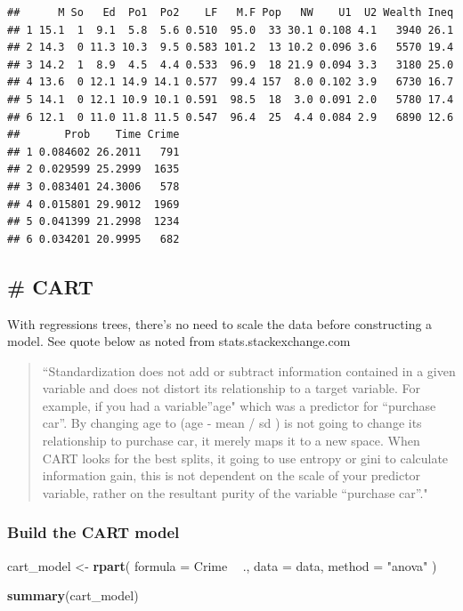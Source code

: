 \documentclass[]{article}
\newenvironment{Shaded}{\begin{snugshade}}{\end{snugshade}}
\newcommand{\KeywordTok}[1]{\textcolor[rgb]{0.13,0.29,0.53}{\textbf{#1}}}
\newcommand{\DataTypeTok}[1]{\textcolor[rgb]{0.13,0.29,0.53}{#1}}
\newcommand{\StringTok}[1]{\textcolor[rgb]{0.31,0.60,0.02}{#1}}
\newcommand{\OperatorTok}[1]{\textcolor[rgb]{0.81,0.36,0.00}{\textbf{#1}}}
\newcommand{\NormalTok}[1]{#1}
\begin{document}
\begin{verbatim}
##      M So   Ed  Po1  Po2    LF   M.F Pop   NW    U1  U2 Wealth Ineq
## 1 15.1  1  9.1  5.8  5.6 0.510  95.0  33 30.1 0.108 4.1   3940 26.1
## 2 14.3  0 11.3 10.3  9.5 0.583 101.2  13 10.2 0.096 3.6   5570 19.4
## 3 14.2  1  8.9  4.5  4.4 0.533  96.9  18 21.9 0.094 3.3   3180 25.0
## 4 13.6  0 12.1 14.9 14.1 0.577  99.4 157  8.0 0.102 3.9   6730 16.7
## 5 14.1  0 12.1 10.9 10.1 0.591  98.5  18  3.0 0.091 2.0   5780 17.4
## 6 12.1  0 11.0 11.8 11.5 0.547  96.4  25  4.4 0.084 2.9   6890 12.6
##       Prob    Time Crime
## 1 0.084602 26.2011   791
## 2 0.029599 25.2999  1635
## 3 0.083401 24.3006   578
## 4 0.015801 29.9012  1969
## 5 0.041399 21.2998  1234
## 6 0.034201 20.9995   682
\end{verbatim}

\subsection{\# CART}\label{cart}

With regressions trees, there's no need to scale the data before
constructing a model. See quote below as noted from
stats.stackexchange.com

\begin{quote}
``Standardization does not add or subtract information contained in a
given variable and does not distort its relationship to a target
variable. For example, if you had a variable''age" which was a predictor
for ``purchase car''. By changing age to (age - mean / sd ) is not going
to change its relationship to purchase car, it merely maps it to a new
space. When CART looks for the best splits, it going to use entropy or
gini to calculate information gain, this is not dependent on the scale
of your predictor variable, rather on the resultant purity of the
variable ``purchase car''."
\end{quote}

\subsubsection{Build the CART model}\label{build-the-cart-model}

\begin{Shaded}
\begin{Highlighting}[]
\NormalTok{cart_model <-}\StringTok{ }\KeywordTok{rpart}\NormalTok{(}
  \DataTypeTok{formula =}\NormalTok{ Crime }\OperatorTok{~}\StringTok{ }\NormalTok{.,}
  \DataTypeTok{data    =}\NormalTok{ data,}
  \DataTypeTok{method  =} \StringTok{"anova"}
\NormalTok{  )}

\KeywordTok{summary}\NormalTok{(cart_model)}
\end{Highlighting}
\end{Shaded}
\end{document}

